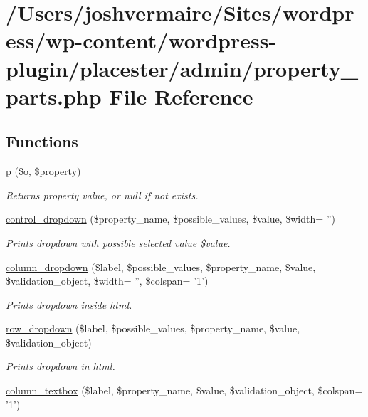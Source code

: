 \hypertarget{property__parts_8php}{
\section{/Users/joshvermaire/Sites/wordpress/wp-\/content/wordpress-\/plugin/placester/admin/property\_\-parts.php File Reference}
\label{db/d70/property__parts_8php}
}
\subsection*{Functions}
\begin{DoxyCompactItemize}
\item 
\hyperlink{property__parts_8php_af485f972f0f0ec073357a35b6ed12949}{p} (\$o, \$property)
\begin{DoxyCompactList}\small\item\em Returns property value, or null if not exists. \end{DoxyCompactList}\item 
\hyperlink{property__parts_8php_ada17cd77079aa6878a2646fa596ae1a3}{control\_\-dropdown} (\$property\_\-name, \$possible\_\-values, \$value, \$width= '')
\begin{DoxyCompactList}\small\item\em Prints dropdown with possible selected value \$value. \end{DoxyCompactList}\item 
\hyperlink{property__parts_8php_aa3560b3163965920cf137c4157724599}{column\_\-dropdown} (\$label, \$possible\_\-values, \$property\_\-name, \$value, \$validation\_\-object, \$width= '', \$colspan= '1')
\begin{DoxyCompactList}\small\item\em Prints dropdown inside html. \end{DoxyCompactList}\item 
\hyperlink{property__parts_8php_a57b2969978e1695f5675d8d2a2eead97}{row\_\-dropdown} (\$label, \$possible\_\-values, \$property\_\-name, \$value, \$validation\_\-object)
\begin{DoxyCompactList}\small\item\em Prints dropdown in html. \end{DoxyCompactList}\item 
\hyperlink{property__parts_8php_ae56df385ef1c3b02c90788419bb0d335}{column\_\-textbox} (\$label, \$property\_\-name, \$value, \$validation\_\-object, \$colspan= '1')

\end{DoxyCompactItemize}
